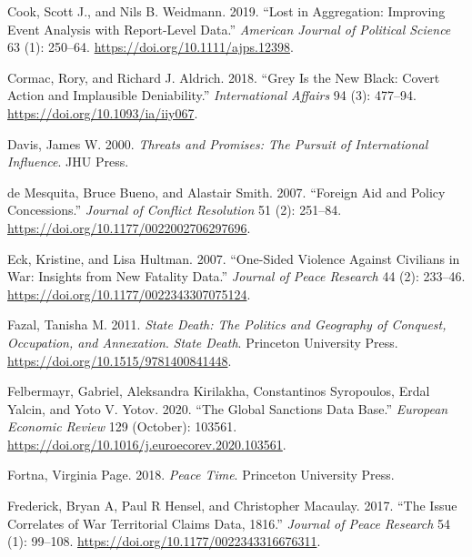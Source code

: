 \documentclass{article}
\newlength{\cslhangindent}
\newlength{\cslentryspacingunit} %
\newenvironment{CSLReferences}[2] %
 {%
  \setlength{\parindent}{0pt}
  \ifodd #1
  \let\oldpar\par
  \def\par{\hangindent=\cslhangindent\oldpar}
  \fi
  \setlength{\parskip}{#2\cslentryspacingunit}
 }%
 {}
\begin{document}
\begin{CSLReferences}{1}{0}
\leavevmode{}%
Cook, Scott J., and Nils B. Weidmann. 2019. {``Lost in {Aggregation}:
{Improving Event Analysis} with {Report-Level Data}.''} \emph{American
Journal of Political Science} 63 (1): 250--64.
\url{https://doi.org/10.1111/ajps.12398}.

\leavevmode{}%
Cormac, Rory, and Richard J. Aldrich. 2018. {``Grey Is the New Black:
Covert Action and Implausible Deniability.''} \emph{International
Affairs} 94 (3): 477--94. \url{https://doi.org/10.1093/ia/iiy067}.

\leavevmode{}%
Davis, James W. 2000. \emph{Threats and {Promises}: {The Pursuit} of
{International Influence}}. {JHU Press}.

\leavevmode{}%
de Mesquita, Bruce Bueno, and Alastair Smith. 2007. {``Foreign {Aid} and
{Policy Concessions}.''} \emph{Journal of Conflict Resolution} 51 (2):
251--84. \url{https://doi.org/10.1177/0022002706297696}.

\leavevmode{}%
Eck, Kristine, and Lisa Hultman. 2007. {``One-{Sided Violence Against
Civilians} in {War}: {Insights} from {New Fatality Data}.''}
\emph{Journal of Peace Research} 44 (2): 233--46.
\url{https://doi.org/10.1177/0022343307075124}.

\leavevmode{}%
Fazal, Tanisha M. 2011. \emph{State {Death}: {The Politics} and
{Geography} of {Conquest}, {Occupation}, and {Annexation}}. \emph{State
Death}. {Princeton University Press}.
\url{https://doi.org/10.1515/9781400841448}.

\leavevmode{}%
Felbermayr, Gabriel, Aleksandra Kirilakha, Constantinos Syropoulos,
Erdal Yalcin, and Yoto V. Yotov. 2020. {``The Global Sanctions Data
Base.''} \emph{European Economic Review} 129 (October): 103561.
\url{https://doi.org/10.1016/j.euroecorev.2020.103561}.

\leavevmode{}%
Fortna, Virginia Page. 2018. \emph{Peace Time}. {Princeton University
Press}.

\leavevmode{}%
Frederick, Bryan A, Paul R Hensel, and Christopher Macaulay. 2017.
{``The {Issue Correlates} of {War Territorial Claims Data},
1816.''} \emph{Journal of Peace Research} 54 (1):
99--108. \url{https://doi.org/10.1177/0022343316676311}.


\end{CSLReferences}
\end{document}
